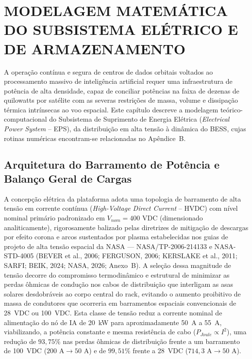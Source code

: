 \section{MODELAGEM MATEMÁTICA DO SUBSISTEMA ELÉTRICO E DE ARMAZENAMENTO}

A operação contínua e segura de centros de dados orbitais voltados ao processamento massivo de inteligência artificial requer uma infraestrutura de potência de alta densidade, capaz de conciliar potências na faixa de dezenas de quilowatts por satélite com as severas restrições de massa, volume e dissipação térmica intrínsecas ao voo espacial. Este capítulo descreve a modelagem teórico-computacional do Subsistema de Suprimento de Energia Elétrica (\textit{Electrical Power System} -- EPS), da distribuição em alta tensão à dinâmica do BESS, cujas rotinas numéricas encontram-se relacionadas no Apêndice~B.

\subsection{Arquitetura do Barramento de Potência e Balanço Geral de Cargas}
\label{sec:arquitetura_barramento_balanco}

A concepção elétrica da plataforma adota uma topologia de barramento de alta tensão em corrente contínua (\textit{High-Voltage Direct Current} -- HVDC) com nível nominal primário padronizado em $V_{nom} = 400\text{ VDC}$ (dimensionado analiticamente), rigorosamente balizado pelas diretrizes de mitigação de descargas por efeito corona e arcos sustentados por plasma estabelecidas nos guias de projeto de alta tensão espacial da NASA --- NASA/TP-2006-214133 e NASA-STD-4005 (BEVER et al., 2006; FERGUSON, 2006; KERSLAKE et al., 2011; SARFI; BEIK, 2024; NASA, 2026; Anexo~B). A seleção dessa magnitude de tensão decorre do compromisso termodinâmico e estrutural de minimizar as perdas ôhmicas de condução nos cabos de distribuição que interligam as asas solares desdobráveis ao corpo central do rack, evitando o aumento proibitivo de massa de condutores que ocorreria em barramentos espaciais convencionais de 28~VDC ou 100~VDC. Esta classe de tensão reduz a corrente nominal de alimentação do nó de IA de 20~kW para aproximadamente 50~A a 55~A, viabilizando, a potência constante e mesma resistência de cabo ($P_{Joule}\propto I^2$), uma redução de $93{,}75\%$ nas perdas ôhmicas de distribuição frente a um barramento de 100~VDC ($200\text{ A}\rightarrow 50\text{ A}$) e de $99{,}51\%$ frente a 28~VDC ($714{,}3\text{ A}\rightarrow 50\text{ A}$).

